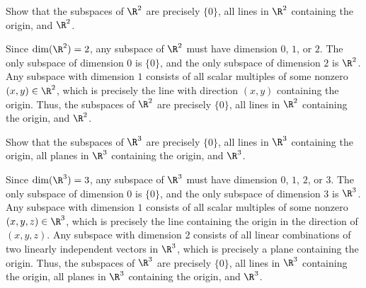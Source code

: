 
\begin{exercise}
Show that the subspaces of $\R^2$ are precisely $\{0\}$, all lines in $\R^2$
containing the origin, and $\R^2$.
\end{exercise}
\begin{solution}

Since $\dim(\R^2)=2$, any subspace of $\R^2$ must have dimension $0$, $1$, or
$2$. The only subspace of dimension $0$ is $\{0\}$, and the only subspace of
dimension $2$ is $\R^2$. Any subspace with dimension $1$ consists of all scalar
multiples of some nonzero $(x,y)\in\R^2$, which is precisely the line with
direction $(x,y)$ containing the origin. Thus, the subspaces of $\R^2$ are
precisely $\{0\}$, all lines in $\R^2$ containing the origin, and $\R^2$.
\end{solution}

\begin{exercise}
Show that the subspaces of $\R^3$ are precisely $\{0\}$, all lines in $\R^3$
containing the origin, all planes in $\R^3$ containing the origin, and $\R^3$.
\end{exercise}
\begin{solution}
Since $\dim(\R^3)=3$, any subspace of $\R^3$ must have dimension $0$, $1$, $2$,
or $3$. The only subspace of dimension $0$ is $\{0\}$, and the only subspace of
dimension $3$ is $\R^3$. Any subspace with dimension $1$ consists of all scalar
multiples of some nonzero $(x,y,z)\in\R^3$, which is precisely the line
containing the origin in the direction of $(x,y,z)$. Any subspace with
dimension $2$ consists of all linear combinations of two linearly independent
vectors in $\R^3$, which is precisely a plane containing the origin. Thus, the
subspaces of $\R^3$ are precisely $\{0\}$, all lines in $\R^3$ containing the
origin, all planes in $\R^3$ containing the origin, and $\R^3$.
\end{solution}

